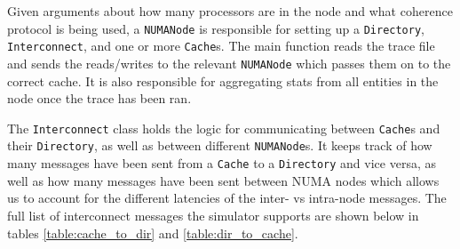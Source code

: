 \documentclass{article}
\def\inline{\lstinline[language=C++, basicstyle=\ttfamily]}
\begin{document}
Given arguments about how many processors are in the node and what coherence protocol is being used, a \inline{NUMANode} is responsible for setting up a \inline{Directory}, \inline{Interconnect}, and one or more \inline{Cache}s. The main function reads the trace file and sends the reads/writes to the relevant \inline{NUMANode} which passes them on to the correct cache.  It is also responsible for aggregating stats from all entities in the node once the trace has been ran.

The \inline{Interconnect} class holds the logic for communicating between \inline{Cache}s and their \inline{Directory}, as well as between different \inline{NUMANode}s.  It keeps track of how many messages have been sent from a \inline{Cache} to a \inline{Directory} and vice versa, as well as how many messages have been sent between NUMA nodes which allows us to account for the different latencies of the inter- vs intra-node messages. The full list of interconnect messages the simulator supports are shown below in tables \ref{table:cache_to_dir} and \ref{table:dir_to_cache}.
\end{document}
